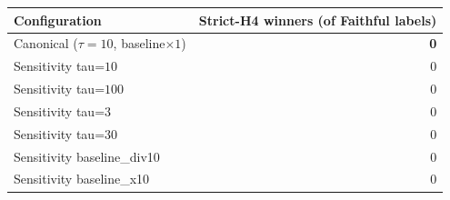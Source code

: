 \begin{tabular}{lr}
\toprule
Configuration & Strict-H4 winners (of Faithful labels) \\
\midrule
Canonical ($\tau=10$, baseline$\times 1$) & \textbf{0} \\
\midrule
Sensitivity tau=$10$ & 0 \\
Sensitivity tau=$100$ & 0 \\
Sensitivity tau=$3$ & 0 \\
Sensitivity tau=$30$ & 0 \\
\midrule
Sensitivity baseline\_div10 & 0 \\
Sensitivity baseline\_x10 & 0 \\
\bottomrule
\end{tabular}
